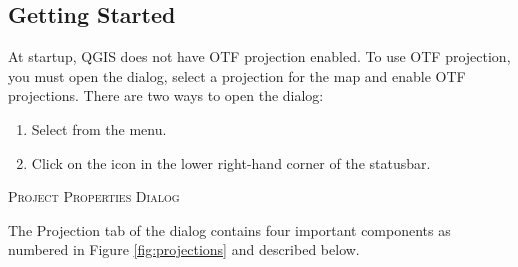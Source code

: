 \subsection{Getting Started}\label{label_projstart}

At startup, QGIS does not have OTF projection enabled. To use OTF
projection, you must open the  dialog, select a
projection for the map and enable OTF projections. There are two ways to open
the  dialog:

\begin{enumerate}
\item Select  from the  menu.
\item Click on the  icon in the lower right-hand corner of the
statusbar.
\end{enumerate}

\begin{Tip}
 \caption{\textsc{Project Properties Dialog}}
\end{Tip}

The Projection tab of the  dialog contains four important components as numbered in Figure
\ref{fig:projections} and described below.


